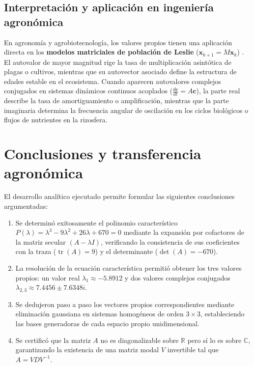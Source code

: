 \documentclass[spanish,letterpaper,oneside]{article}
\begin{document}
\subsection{Interpretación y aplicación en ingeniería agronómica}

En agronomía y agrobiotecnología, los valores propios tienen una aplicación directa en los \textbf{modelos matriciales de población de Leslie} ($\mathbf{x}_{k+1} = M \mathbf{x}_k$) \citep{leslie1945,caswell2001}. El autovalor de mayor magnitud rige la tasa de multiplicación asintótica de plagas o cultivos, mientras que su autovector asociado define la estructura de edades estable en el ecosistema. Cuando aparecen autovalores complejos conjugados en sistemas dinámicos continuos acoplados ($\frac{d\mathbf{c}}{dt} = A\mathbf{c}$), la parte real describe la tasa de amortiguamiento o amplificación, mientras que la parte imaginaria determina la frecuencia angular de oscilación en los ciclos biológicos o flujos de nutrientes en la rizosfera.

\clearpage
\section{Conclusiones y transferencia agronómica}

El desarrollo analítico ejecutado permite formular las siguientes conclusiones argumentadas:
\begin{enumerate}
\item Se determinó exitosamente el polinomio característico $P(\lambda) = \lambda^3 - 9\lambda^2 + 26\lambda + 670 = 0$ mediante la expansión por cofactores de la matriz secular $(A - \lambda I)$, verificando la consistencia de sus coeficientes con la traza ($\operatorname{tr}(A) = 9$) y el determinante ($\det(A) = -670$).
\item La resolución de la ecuación característica permitió obtener los tres valores propios: un valor real $\lambda_1 \approx -5.8912$ y dos valores complejos conjugados $\lambda_{2,3} \approx 7.4456 \pm 7.6348i$.
\item Se dedujeron paso a paso los vectores propios correspondientes mediante eliminación gaussiana en sistemas homogéneos de orden $3 \times 3$, estableciendo las bases generadoras de cada espacio propio unidimensional.
\item Se certificó que la matriz $A$ no es diagonalizable sobre $\mathbb{R}$ pero sí lo es sobre $\mathbb{C}$, garantizando la existencia de una matriz modal $V$ invertible tal que $A = V D V^{-1}$.
\end{enumerate}
\end{document}
